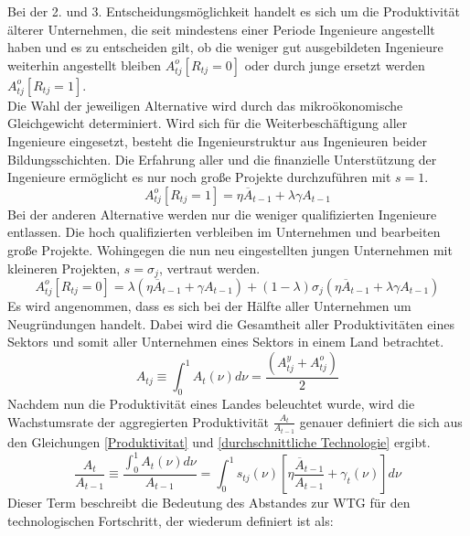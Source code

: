 %
Bei der 2. und 3. Entscheidungsmöglichkeit handelt es sich um die Produktivität älterer Unternehmen, die seit mindestens einer Periode Ingenieure angestellt haben und es zu entscheiden gilt, ob die weniger gut ausgebildeten Ingenieure weiterhin angestellt bleiben $A_{tj}^{o}[R_{tj}=0]$ oder durch junge ersetzt werden $A_{tj}^{o}[R_{tj}=1]$. \\
%
Die Wahl der jeweiligen Alternative wird durch das mikroökonomische Gleichgewicht determiniert. Wird sich für die Weiterbeschäftigung aller Ingenieure eingesetzt, besteht die Ingenieurstruktur aus Ingenieuren beider Bildungsschichten. Die Erfahrung aller und die finanzielle Unterstützung der Ingenieure ermöglicht es nur noch große Projekte durchzuführen mit $s=1$.
%
	\begin{equation}
		A_{tj}^{o}[R_{tj}=1]=\eta\overline{A}_{t-1}+\lambda\gamma A_{t-1}\label{Produktivitat nur alte}
	\end{equation}
%
Bei der anderen Alternative werden nur die weniger qualifizierten Ingenieure entlassen. Die hoch qualifizierten verbleiben im Unternehmen und bearbeiten große Projekte. Wohingegen die nun neu eingestellten jungen Unternehmen mit kleineren Projekten, $s=\sigma_j$, vertraut werden. 
%
	\begin{equation}
		A_{tj}^o[R_{tj}=0]=\lambda(\eta\overline{A}_{t-1}+\gamma A_{t-1})+(1-\lambda)\sigma_j(\eta\overline{A}_{t-1}+\lambda\gamma A_{t-1})\label{Produktivitat alt und jung}
	\end{equation}
%
Es wird angenommen, dass es sich bei der Hälfte aller Unternehmen um Neugründungen handelt. Dabei wird die Gesamtheit aller Produktivitäten eines Sektors und somit aller Unternehmen eines Sektors in einem Land betrachtet. 
%
	\begin{equation}
		A_{tj}\equiv\int_0^1 A_{t}(\nu)d\nu=\frac{(A_{tj}^y+A_{tj}^o)}{2} \label{Produktivitat gesamt}
	\end{equation}
%
Nachdem nun die Produktivität eines Landes beleuchtet wurde, wird die Wachstumsrate der aggregierten Produktivität $\frac{A_t}{A_{t-1}}$ genauer definiert die sich aus den Gleichungen \eqref{Produktivitat} und \eqref{durchschnittliche Technologie} ergibt.
%
	\begin{equation}
		\frac{A_t}{A_{t-1}}\equiv\frac{\int_0^1A_{t}(\nu)d\nu}{A_{t-1}}=\int_0^1s_{tj}(\nu)\left[\eta\frac{\overline{A}_{t-1}}{A_{t-1}}+\gamma_t(\nu)\right]d\nu
		\label{WachstumTechnologie}
	\end{equation}
%
Dieser Term beschreibt die Bedeutung des Abstandes zur WTG für den technologischen Fortschritt, der wiederum definiert ist als: 
